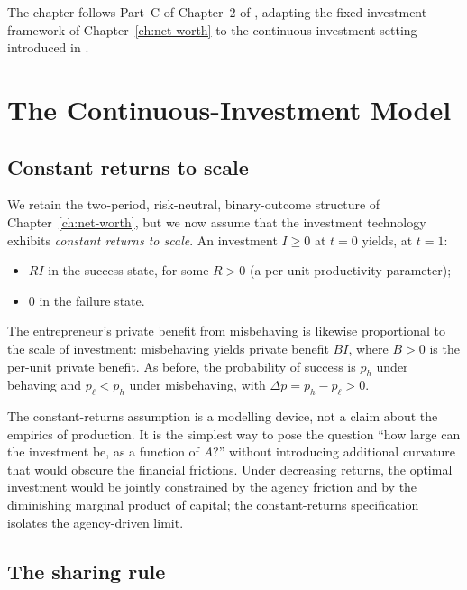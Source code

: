 \documentclass[11pt,a4paper,oneside]{book}
\def\geq{\geqslant}
\theoremstyle{plain}
\theoremstyle{definition}
\theoremstyle{remark}
\numberwithin{equation}{chapter}
\begin{document}
The chapter follows Part~C of Chapter~2 of \citet{Tirole2006}, adapting the fixed-investment framework of Chapter~\ref{ch:net-worth} to the continuous-investment setting introduced in \citet{HolmstromTirole1997}.

\section{The Continuous-Investment Model}
\label{sec:EM-setup}

\subsection{Constant returns to scale}

We retain the two-period, risk-neutral, binary-outcome structure of Chapter~\ref{ch:net-worth}, but we now assume that the investment technology exhibits \emph{constant returns to scale}.
An investment $I \geq 0$ at $t=0$ yields, at $t=1$:
\begin{itemize}
  \item $R I$ in the success state, for some $R > 0$ (a per-unit productivity parameter);
  \item $0$ in the failure state.
\end{itemize}
The entrepreneur's private benefit from misbehaving is likewise proportional to the scale of investment: misbehaving yields private benefit $B I$, where $B > 0$ is the per-unit private benefit.
As before, the probability of success is $p_h$ under behaving and $p_\ell < p_h$ under misbehaving, with $\Delta p = p_h - p_\ell > 0$.

The constant-returns assumption is a modelling device, not a claim about the empirics of production.
It is the simplest way to pose the question ``how large can the investment be, as a function of $A$?'' without introducing additional curvature that would obscure the financial frictions.
Under decreasing returns, the optimal investment would be jointly constrained by the agency friction and by the diminishing marginal product of capital; the constant-returns specification isolates the agency-driven limit.

\subsection{The sharing rule}
\end{document}
